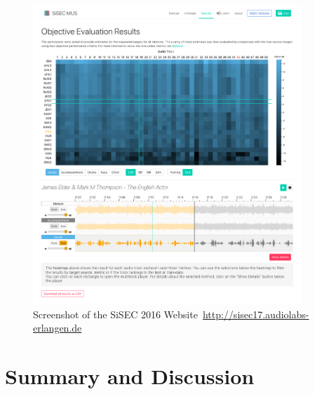 \begin{figure}[!h]
\centering
\includegraphics[width=0.9\textwidth]{Chapters/06_Separation_Unknown/figures/sisec_website.png}
\caption{Screenshot of the SiSEC 2016 Website~\url{http://sisec17.audiolabs-erlangen.de}}
\label{fig:sisec_website}

\end{figure}

\section{Summary and Discussion}

